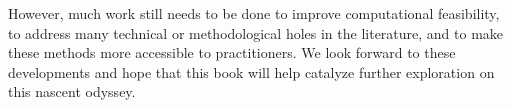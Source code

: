 However, much work still needs to
be done to improve computational feasibility, to address many
technical or methodological holes in the literature,
and to make these methods more accessible to practitioners.
We look forward to these developments and hope that this book will
help catalyze further exploration on this nascent odyssey.

















